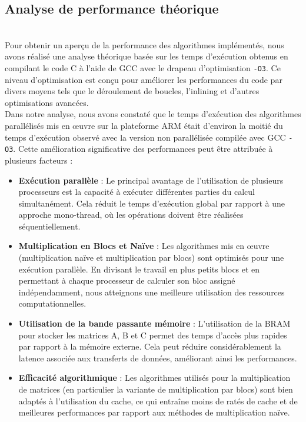\documentclass[../CSC_5RO06_TA.tex]{subfiles}
\begin{document}
\subsection{Analyse de performance théorique}
\\
Pour obtenir un aperçu de la performance des algorithmes implémentés, nous avons réalisé une analyse théorique basée sur les temps d'exécution obtenus en compilant le code C à l'aide de GCC avec le drapeau d'optimisation \texttt{-O3}. Ce niveau d'optimisation est conçu pour améliorer les performances du code par divers moyens tels que le déroulement de boucles, l'inlining et d'autres optimisations avancées.
\\
Dans notre analyse, nous avons constaté que le temps d'exécution des algorithmes parallélisés mis en œuvre sur la plateforme ARM était d'environ la moitié du temps d'exécution observé avec la version non parallélisée compilée avec GCC \texttt{-O3}. Cette amélioration significative des performances peut être attribuée à plusieurs facteurs :
\\
\begin{itemize}
    \item \textbf{Exécution parallèle} : Le principal avantage de l'utilisation de plusieurs processeurs est la capacité à exécuter différentes parties du calcul simultanément. Cela réduit le temps d'exécution global par rapport à une approche mono-thread, où les opérations doivent être réalisées séquentiellement.

    \item \textbf{Multiplication en Blocs et Naïve} : Les algorithmes mis en œuvre (multiplication naïve et multiplication par blocs) sont optimisés pour une exécution parallèle. En divisant le travail en plus petits blocs et en permettant à chaque processeur de calculer son bloc assigné indépendamment, nous atteignons une meilleure utilisation des ressources computationnelles.

    \item \textbf{Utilisation de la bande passante mémoire} : L'utilisation de la BRAM pour stocker les matrices A, B et C permet des temps d'accès plus rapides par rapport à la mémoire externe. Cela peut réduire considérablement la latence associée aux transferts de données, améliorant ainsi les performances.

    \item \textbf{Efficacité algorithmique} : Les algorithmes utilisés pour la multiplication de matrices (en particulier la variante de multiplication par blocs) sont bien adaptés à l'utilisation du cache, ce qui entraîne moins de ratés de cache et de meilleures performances par rapport aux méthodes de multiplication naïve.
\end{itemize}
\end{document}
